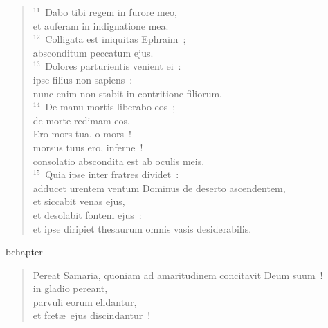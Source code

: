 \begin{flushleft}
\begin{verse}
${}^{11}$~Dabo tibi regem in furore meo,\\ et auferam in indignatione mea.\\
${}^{12}$~Colligata est iniquitas Ephraim~;\\ absconditum peccatum ejus.\\
${}^{13}$~Dolores parturientis venient ei~:\\ ipse filius non sapiens~:\\ nunc enim non stabit in contritione filiorum.\\
${}^{14}$~De manu mortis liberabo eos~;\\ de morte redimam eos.\\ Ero mors tua, o mors~!\\ morsus tuus ero, inferne~!\\ consolatio abscondita est ab oculis meis.\\
${}^{15}$~Quia ipse inter fratres dividet~:\\ adducet urentem ventum Dominus de deserto ascendentem,\\ et siccabit venas ejus,\\ et desolabit fontem ejus~:\\ et ipse diripiet thesaurum omnis vasis desiderabilis.\end{verse}\end{flushleft}


bchapter\begin{flushleft}\begin{verse}\vspace{-19pt}\hspace{6pt}Pereat Samaria, quoniam ad amaritudinem concitavit Deum suum~!\\\hspace{6pt} in gladio pereant,\\ parvuli eorum elidantur,\\ et fœt\ae\ ejus discindantur~!\end{verse}\end{flushleft}


